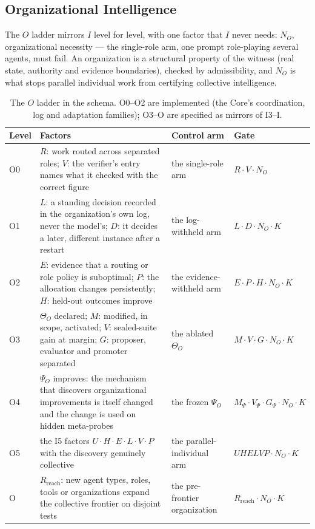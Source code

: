 \subsection{Organizational Intelligence}
The $O$ ladder mirrors $I$ level for level, with one factor that $I$ never needs: $N_O$, organizational necessity --- the single-role arm, one prompt role-playing several agents, must fail. An organization is a structural property of the witness (real state, authority and evidence boundaries), checked by admissibility, and $N_O$ is what stops parallel individual work from certifying collective intelligence.
\begin{table}[!htbp]
\centering\small
\begin{tabularx}{\textwidth}{@{}lYYl@{}}
\toprule
Level & Factors & Control arm & Gate \\
\midrule
O0 & $R$: work routed across separated roles; $V$: the verifier's entry names what it checked with the correct figure & the single-role arm & $R\cdot V\cdot N_O$ \\
O1 & $L$: a standing decision recorded in the organization's own log, never the model's; $D$: it decides a later, different instance after a restart & the log-withheld arm & $L\cdot D\cdot N_O\cdot K$ \\
O2 & $E$: evidence that a routing or role policy is suboptimal; $P$: the allocation changes persistently; $H$: held-out outcomes improve & the evidence-withheld arm & $E\cdot P\cdot H\cdot N_O\cdot K$ \\
O3 & $\Theta_O$ declared; $M$: modified, in scope, activated; $V$: sealed-suite gain at margin; $G$: proposer, evaluator and promoter separated & the ablated $\Theta_O$ & $M\cdot V\cdot G\cdot N_O\cdot K$ \\
O4 & $\Psi_O$ improves: the mechanism that discovers organizational improvements is itself changed and the change is used on hidden meta-probes & the frozen $\Psi_O$ & $M_{\Psi}\cdot V_{\Psi}\cdot G_{\Psi}\cdot N_O\cdot K$ \\
O5 & the I5 factors $U\cdot H\cdot E\cdot L\cdot V\cdot P$ with the discovery genuinely collective & the parallel-individual arm & $U H E L V P\cdot N_O\cdot K$ \\
O\Om{} & $R_{\mathrm{reach}}$: new agent types, roles, tools or organizations expand the collective frontier on disjoint tests & the pre-frontier organization & $R_{\mathrm{reach}}\cdot N_O\cdot K$ \\
\bottomrule
\end{tabularx}
\caption{The $O$ ladder in the schema. O0--O2 are implemented (the Core's coordination, log and adaptation families); O3--O\Om{} are specified as mirrors of I3--I\Om{}.}
\label{tab:ostyle}
\end{table}

